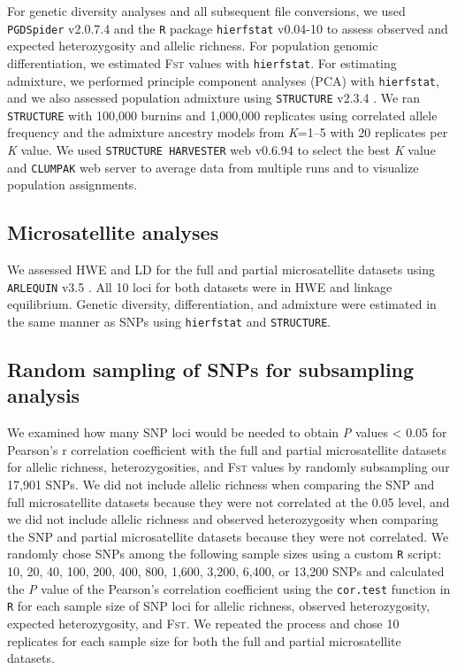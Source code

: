 \documentclass[english]{article}\usepackage[]{graphicx}\usepackage[]{color}
\begin{document}
For genetic diversity analyses and all subsequent file conversions, we used \texttt{PGDSpider} v2.0.7.4 \citep{Lischer_and_Excoffier_2012} and the \texttt{R} package \texttt{hierfstat} v0.04-10 \citep{Goudet_2005} to assess observed and expected heterozygosity and allelic richness. For population genomic differentiation, we estimated \textsc{Fst} values with \texttt{hierfstat}. For estimating admixture, we performed principle component analyses (PCA) with \texttt{hierfstat}, and we also assessed population admixture using \texttt{STRUCTURE} v2.3.4 \citep{Pritchard_et_al_2000, Hubisz_et_al_2009}. We ran \texttt{STRUCTURE} with 100,000 burnins and 1,000,000 replicates using correlated allele frequency and the admixture ancestry models from \textit{K}=1--5 with 20 replicates per \textit{K} value. We used \texttt{STRUCTURE HARVESTER} web v0.6.94 \citep{Earl_and_vonHoldt_2012} to select the best \textit{K} value and \texttt{CLUMPAK} web server \citep{Kopelman_et_al_2015} to average data from multiple runs and to visualize population assignments.

\subsection*{Microsatellite analyses}
We assessed HWE and LD for the full and partial microsatellite datasets using \texttt{ARLEQUIN} v3.5 \citep{Excoffier_and_Lischer_2010}. All 10 loci for both datasets were in HWE and linkage equilibrium. Genetic diversity, differentiation, and admixture were estimated in the same manner as SNPs using \texttt{hierfstat} and \texttt{STRUCTURE}.

\subsection*{Random sampling of SNPs for subsampling analysis}
We examined how many SNP loci would be needed to obtain \textit{P} values < 0.05 for Pearson's r correlation coefficient with the full and partial microsatellite datasets for allelic richness, heterozygosities, and \textsc{Fst} values by randomly subsampling our 17,901 SNPs. We did not include allelic richness when comparing the SNP and full microsatellite datasets because they were not correlated at the 0.05 level, and we did not include allelic richness and observed heterozygosity when comparing the SNP and partial microsatellite datasets because they were not correlated. We randomly chose SNPs among the following sample sizes using a custom \texttt{R} script: 10, 20, 40, 100, 200, 400, 800, 1,600, 3,200, 6,400, or 13,200 SNPs and calculated the \textit{P} value of the Pearson's correlation coefficient using the \texttt{cor.test} function in \texttt{R} for each sample size of SNP loci for allelic richness, observed heterozygosity, expected heterozygosity, and \textsc{Fst}. We repeated the process and chose 10 replicates for each sample size for both the full and partial microsatellite datasets.
\end{document}
